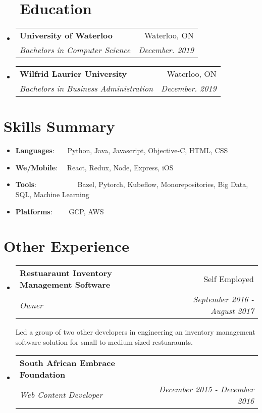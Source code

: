 \documentclass[a4paper,20pt]{article}
\makeatletter
\newcommand{\resumeItem}[2]{
  \item\small{
    \textbf{#1}{: #2 \vspace{-2pt}}
  }
}
\newcommand{\resumeSubheading}[4]{
  \vspace{-1pt}\item
    \begin{tabular*}{0.97\textwidth}{l@{\extracolsep{\fill}}r}
      \textbf{#1} & #2 \\
      \textit{#3} & \textit{#4} \\
    \end{tabular*}\vspace{-5pt}
}
\newcommand{\resumeSubItem}[2]{\resumeItem{#1}{#2}\vspace{-3pt}}
\newcommand{\resumeSubHeadingListStart}{\begin{itemize}[leftmargin=*]}
\newcommand{\resumeSubHeadingListEnd}{\end{itemize}}
\makeatother
\begin{document}
\vspace{-5pt}
\section{~~Education}
  \resumeSubHeadingListStart
    \resumeSubheading
      {University of Waterloo}{Waterloo, ON}
      {Bachelors in Computer Science}{December. 2019}
    \resumeSubheading
      {Wilfrid Laurier University}{Waterloo, ON}
      {Bachelors in Business Administration}{December. 2019}
    \resumeSubHeadingListEnd
	    
\vspace{-5pt}
\section{Skills Summary}
	\resumeSubHeadingListStart
	\resumeSubItem{Languages}{~~~Python, Java, Javascript, Objective-C, HTML, CSS}
	\resumeSubItem{We/Mobile}{~~React, Redux, Node, Express, iOS}
	\resumeSubItem{Tools}{~~~~~~~~~~~Bazel, Pytorch, Kubeflow, Monorepositories, Big Data, SQL, Machine Learning}
	\resumeSubItem{Platforms}{~~~~GCP, AWS}
\resumeSubHeadingListEnd

\vspace{-5pt}
\section{Other Experience}
\resumeSubHeadingListStart

\resumeSubheading{Restuaraunt Inventory Management Software}{Self Employed}
{Owner}{September 2016 - August 2017}
\vspace{5pt}

Led a group of two other developers in engineering an inventory management software solution for 
small to medium sized restuaraunts.


\resumeSubheading{South African Embrace Foundation}{}
{Web Content Developer}{December 2015 - December 2016}
\vspace{5pt}

\resumeSubHeadingListEnd
\end{document}
